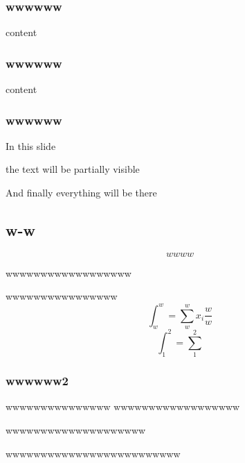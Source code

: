 \documentclass[11pt,aspectratio=1610,spanish]{beamer}
\begin{document}
\subsubsection{wwwwww}
\begin{frame}
	content
\end{frame}

\subsubsection{wwwwww}
\begin{frame}
	content
\end{frame}

\subsubsection{wwwwww}
\begin{frame}
	In this slide \pause

	the text will be partially visible \pause

	And finally everything will be there
\end{frame}

\subsection{w-w}
\begin{frame}
	\begin{equation}\label{key}
		wwww
	\end{equation}
	\begin{theorem}
		wwwwwwwwwwwwwwwwww
	\end{theorem}
	wwwwwwwwwwwwwwww
	\[ \int_{w}^{w}= \sum_{w}^{w}x_i\frac{w}{w} \]
	\[ \int_{1}^{2}=\sum_{1}^{2} \]
\end{frame}

\subsubsection{wwwwww2}

  
\begin{frame}
	\begin{alertblock}{wwwwwwwwwwwwwww}
		wwwwwwwwwwwwwwwwww
	\end{alertblock}
	\begin{example}
		wwwwwwwwwwwwwwwwwwww
	\end{example}
	\begin{lemma}
		wwwwwwwwwwwwwwwwwwwwwwwww
	\end{lemma}
\end{frame}
\end{document}
